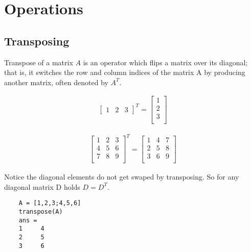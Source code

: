\section{Operations}
\subsection{Transposing}
Transpose of a matrix \(A\) is an operator which flips a matrix over its diagonal; that is, it switches the row and column indices of the matrix A by producing another matrix, often denoted by $A^T$.
\begin{example}
    \begin{align*}
        \begin{bmatrix}
            1 & 2 & 3
        \end{bmatrix}^T = \begin{bmatrix}
            1 \\
            2 \\
            3 \\
        \end{bmatrix}
    \end{align*}
\end{example}
\begin{example}
    \begin{align*}
        \begin{bmatrix}
            1 & 2 & 3 \\
            4 & 5 & 6 \\
            7 & 8 & 9 \\
        \end{bmatrix}^T = \begin{bmatrix}
            1 & 4 & 7 \\
            2 & 5 & 8 \\
            3 & 6 & 9 \\
        \end{bmatrix}
    \end{align*}
\end{example}
Notice the diagonal elements do not get swaped by transposing. So for any diagonal matrix D holds $D=D^T$.
\begin{matlab}
    \begin{lstlisting}
    A = [1,2,3;4,5,6]
    transpose(A)
    ans =
    1     4
    2     5
    3     6
    \end{lstlisting}
\end{matlab}
